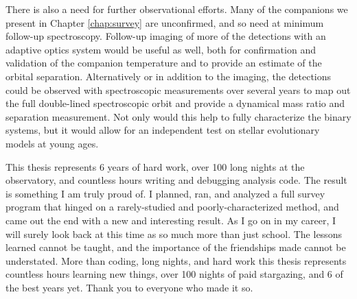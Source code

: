 \documentclass{utthesis}
\begin{document}
There is also a need for further observational efforts. Many of the companions we present in Chapter \ref{chap:survey} are unconfirmed, and so need at minimum follow-up spectroscopy. Follow-up imaging of more of the detections with an adaptive optics system would be useful as well, both for confirmation and validation of the companion temperature and to provide an estimate of the orbital separation. Alternatively or in addition to the imaging, the detections could be observed with spectroscopic measurements over several years to map out the full double-lined spectroscopic orbit and provide a dynamical mass ratio and separation measurement. Not only would this help to fully characterize the binary systems, but it would allow for an independent test on stellar evolutionary models at young ages.

This thesis represents 6 years of hard work, over 100 long nights at the observatory, and countless hours writing and debugging analysis code. The result is something I am truly proud of. I planned, ran, and analyzed a full survey program that hinged on a rarely-studied and poorly-characterized method, and came out the end with a new and interesting result. As I go on in my career, I will surely look back at this time as so much more than just school. The lessons learned cannot be taught, and the importance of the friendships made cannot be understated. More than coding, long nights, and hard work this thesis represents countless hours learning new things, over 100 nights of paid stargazing, and 6 of the best years yet. Thank you to everyone who made it so.







\backmatter

\printindex

\cleardoublepage
{}

\end{document}
